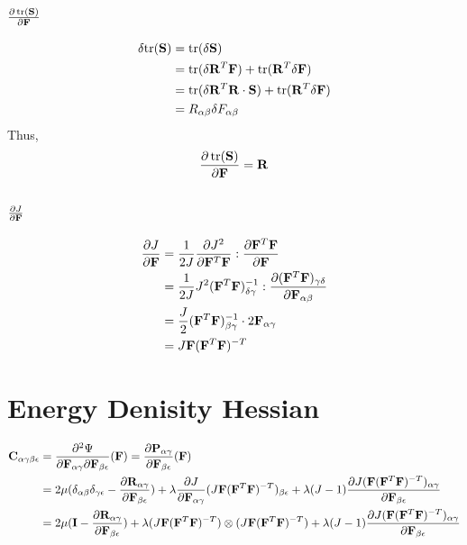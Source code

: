 \documentclass{article}
\begin{document}
    \subsection{$\frac{\partial \, \text{tr}(\mathbf{S})}{\partial \mathbf{F}}$}
    \begin{equation}
    \begin{aligned}
        \delta\text{tr}(\mathbf{S}) &= \text{tr}(\delta \mathbf{S})\\
        &= \text{tr}(\delta\mathbf{R}^T\mathbf{F}) + \text{tr}(\mathbf{R}^T\delta\mathbf{F})\\
        &= \text{tr}(\delta\mathbf{R}^T\mathbf{R}\cdot\mathbf{S})  + \text{tr}(\mathbf{R}^T\delta\mathbf{F})\\
        &= R_{\alpha\beta}\delta F_{\alpha\beta}
    \end{aligned}
    \end{equation}
    Thus,
    \begin{equation}
        \frac{\partial \, \text{tr}(\mathbf{S})}{\partial \mathbf{F}} = \mathbf{R}
    \end{equation}

    \subsection{$\frac{\partial J}{\partial \mathbf{F}}$}
    \begin{equation}
    \begin{aligned}
        \frac{\partial J}{\partial \mathbf{F}} &= \frac{1}{2J}\frac{\partial J^2}{\partial \mathbf{F}^T\mathbf{F}}:\frac{\partial \mathbf{F}^T\mathbf{F}}{\partial \mathbf{F}}\\
        &= \frac{1}{2J}J^2(\mathbf{F}^T\mathbf{F})^{-1}_{\delta\gamma}:\frac{\partial (\mathbf{F}^T\mathbf{F})_{\gamma\delta}}{\partial \mathbf{F}_{\alpha\beta}} \\
        &= \frac{J}{2}(\mathbf{F}^T\mathbf{F})^{-1}_{\beta\gamma}\cdot2\mathbf{F}_{\alpha\gamma}\\
        &= J\mathbf{F}(\mathbf{F}^T\mathbf{F})^{-T}\\ 
    \end{aligned}
    \end{equation}

\section{Energy Denisity Hessian}
    \begin{equation}
    \begin{aligned}
        \mathbf{C}_{\alpha\gamma\beta\epsilon} &= \frac{\partial^2 \Psi}{\partial \mathbf{F}_{\alpha\gamma}\partial \mathbf{F}_{\beta\epsilon}}(\mathbf{F}) = \frac{\partial \mathbf{P}_{\alpha\gamma}}{\partial\mathbf{F}_{\beta\epsilon}}(\mathbf{F})\\
        &= 2\mu(\delta_{\alpha\beta}\delta_{\gamma\epsilon}-\frac{\partial \mathbf{R}_{\alpha\gamma}}{\partial \mathbf{F}_{\beta\epsilon}})+\lambda\frac{\partial J}{\partial \mathbf{F}_{\alpha\gamma}}(J\mathbf{F}(\mathbf{F}^T\mathbf{F})^{-T})_{\beta\epsilon}+\lambda(J-1)\frac{\partial J(\mathbf{F}(\mathbf{F}^T\mathbf{F})^{-T})_{\alpha\gamma}}{\partial \mathbf{F}_{\beta\epsilon}}\\
        &= 2\mu(\mathbf{I}-\frac{\partial \mathbf{R}_{\alpha\gamma}}{\partial \mathbf{F}_{\beta\epsilon}})+\lambda(J\mathbf{F}(\mathbf{F}^T\mathbf{F})^{-T})\otimes (J\mathbf{F}(\mathbf{F}^T\mathbf{F})^{-T})+\lambda(J-1)\frac{\partial J(\mathbf{F}(\mathbf{F}^T\mathbf{F})^{-T})_{\alpha\gamma}}{\partial \mathbf{F}_{\beta\epsilon}}
    \end{aligned}
    \end{equation}
\end{document}
